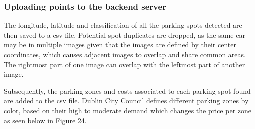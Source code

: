 \newpage

\subsubsection{Uploading points to the backend server}
The longitude, latitude and classification of all the parking spots detected are
then saved to a csv file. Potential spot duplicates are dropped, as the same car
may be in multiple images given that the images are defined by their center
coordinates, which causes adjacent images to overlap and share common areas. The
rightmost part of one image can overlap with the leftmost part of another image.

Subsequently, the parking zones and costs associated to each parking spot found
are added to the csv file. Dublin City Council defines different parking zones
by color, based on their high to moderate demand which changes the price per
zone as seen below in Figure 24.

